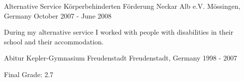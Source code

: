 \begin{cventries}
{\begin{cvitems}
      \end{cvitems}
    }
  \cventry
    {Alternative Service}
    {Körperbehinderten Förderung Neckar Alb e.V.}
    {Mössingen, Germany}
    {October 2007 - June 2008}
    {
      \begin{cvitems}
      \item[] {During my alternative service I worked with people with disabilities in
	their school and their accommodation.}
      \end{cvitems}
    }
  \cventry
    {Abitur}
    {Kepler-Gymnasium Freudenstadt}
    {Freudenstadt, Germany}
    {1998 - 2007}
    {
      \begin{cvitems}
      \item[] {Final Grade: 2.7}
      \end{cvitems}
    }
\end{cventries}
